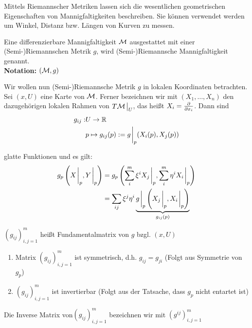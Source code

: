 
Mittels Riemannscher Metriken lassen sich die wesentlichen geometrischen Eigenschaften von Mannigfaltigkeiten beschreiben.
Sie können verwendet werden um Winkel, Distanz bzw. Längen von Kurven zu messen.

\begin{defs}
Eine differenzierbare Mannigfaltigkeit $\mathcal{M}$ ausgestattet mit einer (Semi-)Riemannschen Metrik $g$, wird (Semi-)Riemannsche Mannigfaltigkeit genannt.\\
\textbf{Notation:} $(\mathcal{M}, g)$
\end{defs}

Wir wollen nun (Semi-)Riemannsche Metrik $g$ in lokalen Koordinaten betrachten.
Sei $(x, U)$ eine Karte von $\mathcal{M}$.
Ferner bezeichnen wir mit $(X_1, \dots, X_n)$ den dazugehörigen lokalen Rahmen von $T\mfk \eval_U$,
das heißt $X_i = \pdv{x_i}$.
Dann sind 
\begin{align}
g_{ij}: &U \to \R \\
& p \mapsto g_{ij} (p) := g\eval_p (X_i (p), X_j (p))
\end{align}

glatte Funktionen und es gilt:
\begin{align}
g_p \left( X\eval_p, Y \eval_p \right) &= g_p \left( \sum_i^m \xi^i X_j \eval_p, \sum_i^m \eta^i X_i \eval_p \right) \\
&= \sum_{ij} \xi^j \eta^i \underbrace{g\eval_p \left( X_j \eval_p, X_i \eval_p\right) }_{g_{ij}(p)}
\end{align}

\begin{defs}[Fundamentalmatrix]
$(g_{ij})^m_{i, j = 1}$ heißt Fundamentalmatrix von $g$ bzgl. $(x, U)$
\end{defs}

\begin{bem}\leavevmode
\begin{enumerate}
\item Matrix $(g_{ij})^m_{i, j = 1}$ ist symmetrisch, d.h. $g_{ij} = g_{ji}$ (Folgt aus Symmetrie von $g_p$)
\item $(g_{ij})^m_{i, j = 1}$ ist invertierbar (Folgt aus der Tatsache, dass $g_p$ nicht entartet ist)
\end{enumerate}
Die Inverse Matrix von$(g_{ij})^m_{i, j = 1}$ bezeichnen wir mit $(g^{ij})^m_{i, j = 1}$
\end{bem}

